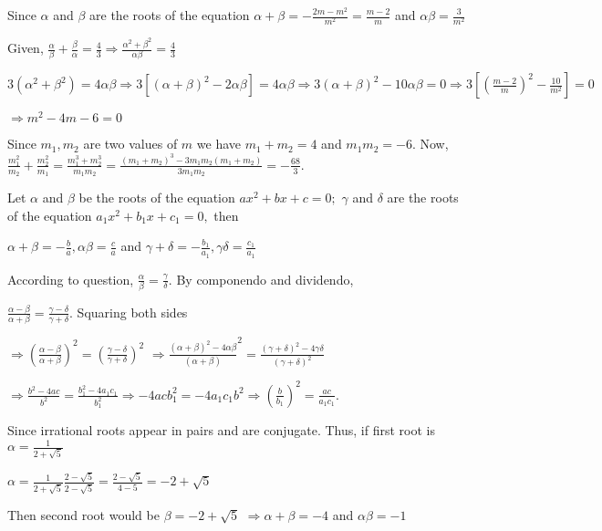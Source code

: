   Since $\alpha$ and $\beta$ are the roots of the equation $\alpha + \beta = -\frac{2m - m^2}{m^2} = \frac{m -
    2}{m}$ and $\alpha\beta = \frac{3}{m^2}$

  Given, $\frac{\alpha}{\beta} + \frac{\beta}{\alpha} = \frac{4}{3} \Rightarrow \frac{\alpha^2 + \beta^2}{\alpha\beta} =
  \frac{4}{3}$

  $3(\alpha^2 + \beta^2) = 4\alpha\beta \Rightarrow 3[(\alpha + \beta)^2 - 2\alpha\beta] =
  4\alpha\beta\Rightarrow 3(\alpha + \beta)^2 - 10\alpha\beta = 0 \Rightarrow 3\left[\left(\frac{m -
      2}{m}\right)^2 - \frac{10}{m^2}\right] = 0$

  $\Rightarrow m^2 - 4m - 6 = 0$

  Since $m_1, m_2$ are two values of $m$ we have $m_1 + m_2 = 4$ and $m_1m_2 = -6$. Now, $\frac{m_1^2}{m_2}
  + \frac{m_2^2}{m_1} = \frac{m_1^3 + m_2^3}{m_1m_2} = \frac{(m_1 + m_2)^3 - 3m_1m_2(m_1 + m_2)}{3m_1m_2} =
  -\frac{68}{3}$.
\item Let $\alpha$ and $\beta$ be the roots of the equation $ax^2 + bx + c = 0;$ $\gamma$ and $\delta$
  are the roots of the equation $a_1x^2 + b_1x + c_1 = 0,$ then

  $\alpha + \beta = -\frac{b}{a}, \alpha\beta = \frac{c}{a}$ and $\gamma + \delta = -\frac{b_1}{a_1},
  \gamma\delta = \frac{c_1}{a_1}$

  According to question, $\frac{\alpha}{\beta} = \frac{\gamma}{\delta}$. By componendo and dividendo,

  $\frac{\alpha - \beta}{\alpha + \beta} = \frac{\gamma - \delta}{\gamma + \delta}$. Squaring both sides

  $\Rightarrow \left(\frac{\alpha - \beta}{\alpha + \beta}\right)^2 = \left(\frac{\gamma - \delta}{\gamma +
    \delta}\right)^2$ $\Rightarrow \frac{(\alpha + \beta)^2 - 4\alpha\beta}{(\alpha + \beta)}^2 = \frac{(\gamma + \delta)^2 - 4\gamma\delta}{(\gamma +
      \delta)^2}$

  $\Rightarrow \frac{b^2 - 4ac}{b^2} = \frac{b_1^2 - 4a_1c_1}{b_1^2} \Rightarrow -4acb_1^2 = -4a_1c_1b^2 \Rightarrow
  \left(\frac{b}{b_1}\right)^2 = \frac{ac}{a_1c_1}$.
\item Since irrational roots appear in pairs and are conjugate. Thus, if first root is $\alpha = \frac{1}{2 + \sqrt{5}}$

  $\alpha = \frac{1}{2 + \sqrt{5}}\frac{2 - \sqrt{5}}{2 - \sqrt{5}} = \frac{2 - \sqrt{5}}{4 - 5} = -2 + \sqrt{5}$

  Then second root would be $\beta = -2 + \sqrt{5}$ $\Rightarrow \alpha + \beta = -4$ and $\alpha\beta = -1$

